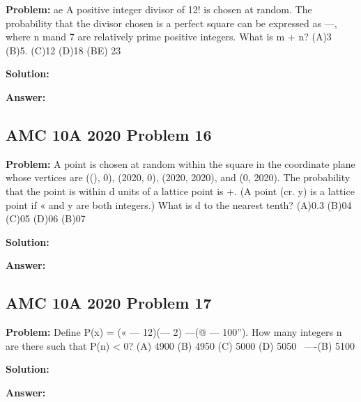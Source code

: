 \documentclass{article}
\newenvironment{problem}{\textbf{Problem: }}{\\}
\newenvironment{solution}{\textbf{Solution: }}{\\}
\newenvironment{answer}{\textbf{Answer: }}{\\}
\begin{document}
\begin{problem}
ae A positive integer divisor of 12! is chosen at random. The probability that the divisor chosen is a perfect square can be expressed as —, where n mand 7 are relatively prime positive integers. What is m + n? (A)3 (B)5. (C)12 (D)18 (BE) 23
\end{problem}

\begin{solution}
\end{solution}

\begin{answer}
\end{answer}

\subsection{AMC 10A 2020 Problem 16}

\begin{problem}
A point is chosen at random within the square in the coordinate plane whose vertices are ((), 0), (2020, 0), (2020, 2020), and (0, 2020). The probability that the point is within d units of a lattice point is +. (A point (cr. y) is a lattice point if « and y are both integers.) What is d to the nearest tenth? (A)0.3 (B)04 (C)05 (D)06 (B)07
\end{problem}

\begin{solution}
\end{solution}

\begin{answer}
\end{answer}

\subsection{AMC 10A 2020 Problem 17}

\begin{problem}
Define P(x) = (« — 12)(— 2) ---(@ — 100”). How many integers n are there such that P(n) < 0? (A) 4900 (B) 4950 (C) 5000 (D) 5050 ~—-(B) 5100
\end{problem}

\begin{solution}
\end{solution}

\begin{answer}
\end{answer}
\end{document}
